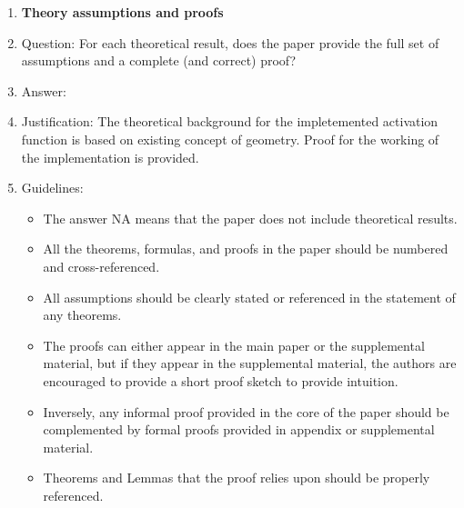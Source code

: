 \documentclass{article}
\begin{document}
\begin{enumerate}
\item {\bf Theory assumptions and proofs}
    \item[] Question: For each theoretical result, does the paper provide the full set of assumptions and a complete (and correct) proof?
    \item[] Answer: \answerYes{} %
    \item[] Justification: The theoretical background for the impletemented activation function is based on existing concept of geometry. Proof for the working of the implementation is provided.
    \item[] Guidelines:
    \begin{itemize}
        \item The answer NA means that the paper does not include theoretical results. 
        \item All the theorems, formulas, and proofs in the paper should be numbered and cross-referenced.
        \item All assumptions should be clearly stated or referenced in the statement of any theorems.
        \item The proofs can either appear in the main paper or the supplemental material, but if they appear in the supplemental material, the authors are encouraged to provide a short proof sketch to provide intuition. 
        \item Inversely, any informal proof provided in the core of the paper should be complemented by formal proofs provided in appendix or supplemental material.
        \item Theorems and Lemmas that the proof relies upon should be properly referenced. 
    \end{itemize}


\end{enumerate}
\end{document}
